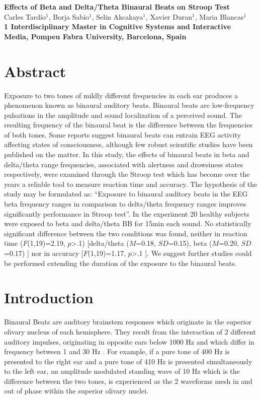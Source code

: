 \documentclass[10pt]{article}
\date{}
\begin{document}
\begin{flushleft}
{\Large
\textbf{Effects of Beta and Delta/Theta Binaural Beats on Stroop Test}
}
\\
Carles Tard\'io$^{1}$, 
Borja Sabio$^{1}$, 
Selin Akcakaya$^{1}$,
Xavier Duran$^{1}$,
Maria Blancas$^{1}$
\\
\bf{1} Interdisciplinary Master in Cognitive Systems and Interactive Media, Pompeu Fabra University, Barcelona, Spain

\end{flushleft}

\section*{Abstract}
Exposure to two tones of mildly different frequencies in each ear produces a phenomenon known as binaural auditory beats. Binaural beats are low-frequency pulsations in the amplitude and sound localization of a perceived sound. The resulting frequency of the binaural beat is the difference between the frequencies of both tones. Some reports suggest binaural beats can entrain EEG activity affecting states of consciousness, although few robust scientific studies have been published on the matter. In this study, the effects of binaural beats in beta and delta/theta range frequencies, associated with alertness and drowsiness states respectively, were examined through the Stroop test which has become over the years a reliable tool to measure reaction time and accuracy. The hypothesis of the study may be formulated as: “Exposure to binaural auditory beats in the EEG beta frequency ranges in comparison to delta/theta frequency ranges improves significantly performance in Stroop test”. In the experiment 20 healthy subjects were exposed to beta and delta/theta BB for 15min each sound. No statistically significant difference between the two conditions was found, neither in reaction time (\(F\)(1,19)=2.19, \(p\)\textgreater.1) [delta/theta (\(M\)=0.18, \(SD\)=0.15), beta (\(M\)=0.20, \(SD\)=0.17) ] nor in accuracy [\(F\)(1,19)=1.17, \(p\)\textgreater.1 ]. We suggest further studies could be performed extending the duration of the exposure to the binaural beats.

\section*{Introduction}
Binaural Beats are auditory brainstem responses which originate in the superior olivary nucleus of each hemisphere. They result from the interaction of 2 different auditory impulses, originating in opposite ears below 1000 Hz and which differ in frequency between 1 and 30 Hz \cite{oster1973auditory}. For example, if a pure tone of 400 Hz is presented to the right ear and a pure tone of 410 Hz is presented simultaneously to the left ear, an amplitude modulated standing wave of 10 Hz which is the difference between the two tones, is experienced as the 2 waveforms mesh in and out of phase within the superior olivary nuclei.
 
\end{document}
